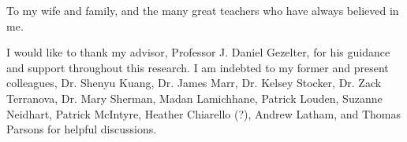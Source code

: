\documentclass[draft]{nddiss2e}
\begin{document}

\renewcommand{\dedicationname}{DEDICATION} %
\begin{dedication}
To my wife and family, and the many great teachers who have always believed in me.
\end{dedication}

\tableofcontents
\listoffigures
\listoftables



\begin{acknowledge}
I would like to thank my advisor, Professor J. Daniel Gezelter, for his
guidance and support throughout this research.
I am indebted to my former and present colleagues, Dr. Shenyu Kuang, Dr. James
Marr, Dr. Kelsey Stocker, Dr. Zack Terranova, Dr. Mary Sherman, Madan
Lamichhane, Patrick Louden, Suzanne Neidhart, Patrick McIntyre, Heather
Chiarello (?), Andrew Latham, and Thomas Parsons for helpful discussions. 
\end{acknowledge}
\end{document}
